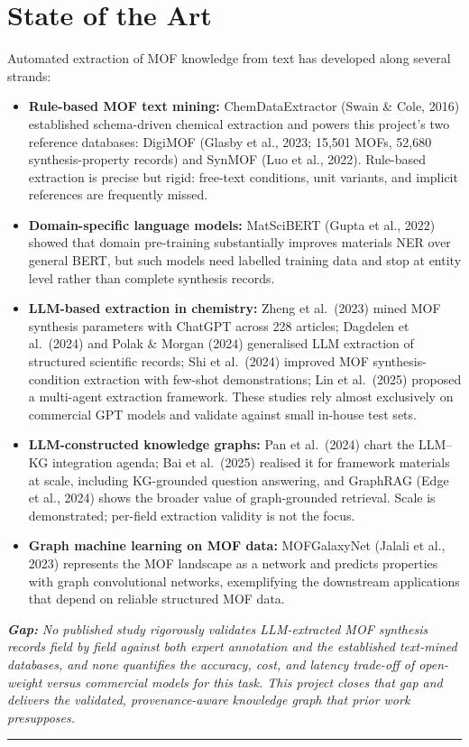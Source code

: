 \documentclass[11pt,a4paper]{article}
\newcommand{\srhrule}{\vspace{0.4ex}\noindent\textcolor{srhorange}{\rule{\linewidth}{0.4pt}}\vspace{0.6ex}}
\begin{document}
\section{State of the Art}
Automated extraction of MOF knowledge from text has developed along several strands:
\begin{itemize}
  \item \textbf{Rule-based MOF text mining:} ChemDataExtractor (Swain \& Cole, 2016) established schema-driven chemical extraction and powers this project's two reference databases: DigiMOF (Glasby et al., 2023; 15{,}501 MOFs, 52{,}680 synthesis-property records) and SynMOF (Luo et al., 2022). Rule-based extraction is precise but rigid: free-text conditions, unit variants, and implicit references are frequently missed.
  \item \textbf{Domain-specific language models:} MatSciBERT (Gupta et al., 2022) showed that domain pre-training substantially improves materials NER over general BERT, but such models need labelled training data and stop at entity level rather than complete synthesis records.
  \item \textbf{LLM-based extraction in chemistry:} Zheng et al.\ (2023) mined MOF synthesis parameters with ChatGPT across 228 articles; Dagdelen et al.\ (2024) and Polak \& Morgan (2024) generalised LLM extraction of structured scientific records; Shi et al.\ (2024) improved MOF synthesis-condition extraction with few-shot demonstrations; Lin et al.\ (2025) proposed a multi-agent extraction framework. These studies rely almost exclusively on commercial GPT models and validate against small in-house test sets.
  \item \textbf{LLM-constructed knowledge graphs:} Pan et al.\ (2024) chart the LLM--KG integration agenda; Bai et al.\ (2025) realised it for framework materials at scale, including KG-grounded question answering, and GraphRAG (Edge et al., 2024) shows the broader value of graph-grounded retrieval. Scale is demonstrated; per-field extraction validity is not the focus.
  \item \textbf{Graph machine learning on MOF data:} MOFGalaxyNet (Jalali et al., 2023) represents the MOF landscape as a network and predicts properties with graph convolutional networks, exemplifying the downstream applications that depend on reliable structured MOF data.
\end{itemize}
\textbf{\textit{Gap:}} \textit{No published study rigorously validates LLM-extracted MOF synthesis records field by field against both expert annotation and the established text-mined databases, and none quantifies the accuracy, cost, and latency trade-off of open-weight versus commercial models for this task. This project closes that gap and delivers the validated, provenance-aware knowledge graph that prior work presupposes.}
\srhrule
\end{document}
